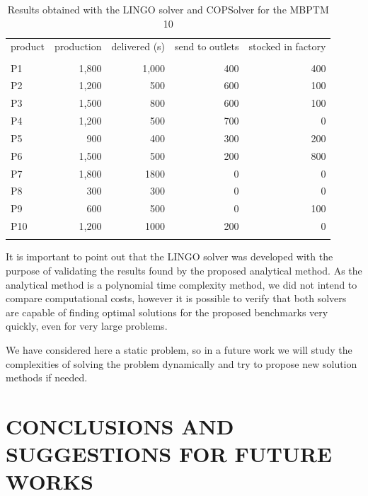 \documentclass[10pt,fleqn,a4paper,twoside]{article}
\begin{document}
\begin{table}[h]
\begin{center}
\begin{footnotesize}
\begin{tabular}[c]{l r r r r}
product & production & delivered (s) & send to outlets & stocked in factory \\
\cline {1-5} \\
P1 & 1,800 & 1,000 & 400 & 400 \\
P2 & 1,200 & 500 & 600 & 100 \\
P3 & 1,500 & 800 & 600 & 100 \\
P4 & 1,200 & 500 & 700 & 0 \\
P5 & 900 & 400 & 300 & 200 \\
P6 & 1,500 & 500 & 200 & 800 \\
P7 & 1,800 & 1800 & 0 & 0 \\
P8 & 300 & 300 & 0 & 0 \\
P9 & 600 & 500 & 0 & 100 \\
P10 & 1,200 & 1000 & 200 & 0 \\
\cline {1-5} \\
\end{tabular}
\caption{Results obtained with the LINGO solver and COPSolver for the MBPTM 10}
\label{tab:compResultsMBPTMP3}
\end{footnotesize}
\end{center}
\end{table}

It is important to point out that the LINGO solver was developed with the purpose of validating the results found by the proposed analytical method. As the analytical method is a polynomial time complexity method, we did not intend to compare computational costs, however it is possible to verify that both solvers are capable of finding optimal solutions for the proposed benchmarks very quickly, even for very large problems.

We have considered here a static problem, so in a future work we will study the complexities of solving the problem dynamically and try to propose new solution methods if needed. 

\section{CONCLUSIONS AND SUGGESTIONS FOR FUTURE WORKS}
\label{sec:conclusions}
\end{document}
